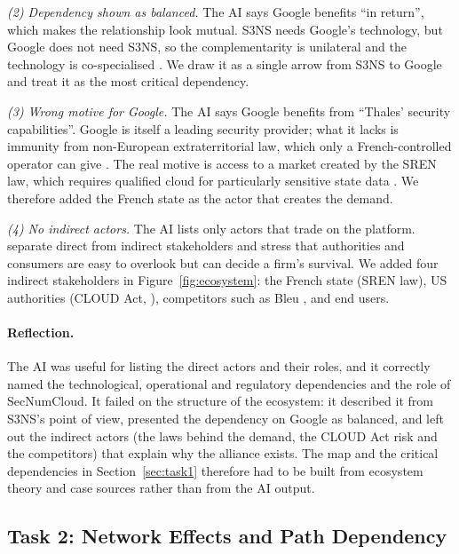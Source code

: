 \textit{(2) Dependency shown as balanced.} The AI says Google benefits ``in
return'', which makes the relationship look mutual. S3NS needs Google's
technology, but Google does not need S3NS, so the complementarity is unilateral
\parencite[p.~114]{overby2021} and the technology is co-specialised
\parencite[slide~30]{windekilde2026ecosystem}. We draw it as a single arrow
from S3NS to Google and treat it as the most critical dependency.

\textit{(3) Wrong motive for Google.} The AI says Google benefits from
``Thales' security capabilities''. Google is itself a leading security
provider; what it lacks is immunity from non-European extraterritorial law,
which only a French-controlled operator can give \parencite{s3ns2025premi3ns}.
The real motive is access to a market created by the SREN law, which requires
qualified cloud for particularly sensitive state data \parencite{decretsren2026}.
We therefore added the French state as the actor that creates the demand.

\textit{(4) No indirect actors.} The AI lists only actors that trade on the
platform. \textcite[p.~58]{overby2021} separate direct from indirect
stakeholders and stress that authorities and consumers are easy to overlook but
can decide a firm's survival. We added four indirect stakeholders in
Figure~\ref{fig:ecosystem}: the French state (SREN law), US authorities
(CLOUD Act, \cite{doj2019cloudact}), competitors such as Bleu
\parencite{lemagit2023usf}, and end users.
\paragraph{Reflection.} The AI was useful for listing the direct actors and
their roles, and it correctly named the technological, operational and
regulatory dependencies and the role of SecNumCloud. It failed on the structure
of the ecosystem: it described it from S3NS's point of view, presented the
dependency on Google as balanced, and left out the indirect actors (the laws
behind the demand, the CLOUD Act risk and the competitors) that explain why the
alliance exists. The map and the critical dependencies in
Section~\ref{sec:task1} therefore had to be built from ecosystem theory and
case sources rather than from the AI output.

\subsection{Task 2: Network Effects and Path Dependency}

